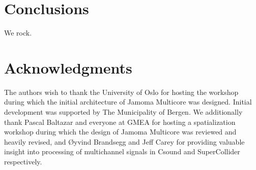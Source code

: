 \documentclass[twoside,a4paper]{article}
\begin{document}

\section{Conclusions}
We rock.

%
%
%
%




\section{Acknowledgments}

The authors wish to thank the University of Oslo for hosting the workshop during which the initial architecture of Jamoma Multicore was designed. 
Initial development was supported by The Municipality of Bergen.  
We additionally thank Pascal Baltazar and everyone at GMEA for hosting a spatialization workshop during which the design of Jamoma Multicore was reviewed and heavily revised, and \O yvind Brandsegg and Jeff Carey for providing valuable insight into processing of multichannel signals in Csound and SuperCollider respectively.




\end{document}
